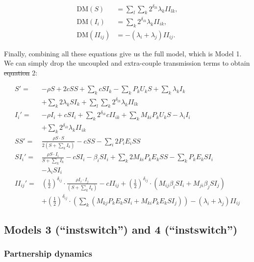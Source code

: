 \documentclass[10pt,letterpaper]{article}
\newcommand{\khalf}{\left(\frac{1}{2}\right)^{\delta_{ij}}}  %
\newcommand{\DM}{\textrm{DM}}
\providecommand{\DIFaddtex}[1]{{\protect\color{blue}\uwave{#1}}} %
\providecommand{\DIFdeltex}[1]{{\protect\color{red}\sout{#1}}}                      %
\providecommand{\DIFaddbegin}{} %
\providecommand{\DIFaddend}{} %
\providecommand{\DIFdelbegin}{} %
\providecommand{\DIFdelend}{} %
\providecommand{\DIFadd}[1]{\texorpdfstring{\DIFaddtex{#1}}{#1}} %
\providecommand{\DIFdel}[1]{\texorpdfstring{\DIFdeltex{#1}}{}} %
\newcommand{\DIFscaledelfig}{0.5}
\newlength{\DIFdelgraphicswidth} %
\newlength{\DIFdelgraphicsheight} %
\newcommand{\DIFaddincludegraphics}[2][]{{\color{blue}\fbox{\DIFOincludegraphics[#1]{#2}}}} %
\newcommand{\DIFdelincludegraphics}[2][]{%
\sbox{\DIFdelgraphicsbox}{\DIFOincludegraphics[#1]{#2}}%
\settoboxwidth{\DIFdelgraphicswidth}{\DIFdelgraphicsbox} %
\settoboxtotalheight{\DIFdelgraphicsheight}{\DIFdelgraphicsbox} %
\scalebox{\DIFscaledelfig}{%
\parbox[b]{\DIFdelgraphicswidth}{\usebox{\DIFdelgraphicsbox}\\[-\baselineskip] \rule{\DIFdelgraphicswidth}{0em}}\llap{\resizebox{\DIFdelgraphicswidth}{\DIFdelgraphicsheight}{%
\setlength{\unitlength}{\DIFdelgraphicswidth}%
\begin{picture}(1,1)%
\thicklines\linethickness{2pt} %
{\color[rgb]{1,0,0}\put(0,0){\framebox(1,1){}}}%
{\color[rgb]{1,0,0}\put(0,0){\line( 1,1){1}}}%
{\color[rgb]{1,0,0}\put(0,1){\line(1,-1){1}}}%
\end{picture}%
}\hspace*{3pt}}} %
} %
\DeclareRobustCommand{\DIFaddbegin}{\DIFOaddbegin \let\includegraphics\DIFaddincludegraphics} %
\DeclareRobustCommand{\DIFaddend}{\DIFOaddend \let\includegraphics\DIFOincludegraphics} %
\DeclareRobustCommand{\DIFdelbegin}{\DIFOdelbegin \let\includegraphics\DIFdelincludegraphics} %
\DeclareRobustCommand{\DIFdelend}{\DIFOaddend \let\includegraphics\DIFOincludegraphics} %
\begin{document}
\begin{equation}
\begin{aligned}
\DM(S) &= \sum_l \sum_k  2^{\delta_{lk}} \lambda_k II_{lk}, \\
\DM(I_i) &=  \sum_k 2^{\delta_{ik}} \lambda_k II_{ik}, \\
\DM(II_{ij}) &= -(\lambda_i + \lambda_j) II_{ij}.
\end{aligned}
\end{equation}

Finally, combining all these equations give us the full model, which is Model 1. We can simply drop the uncoupled and extra-couple transmission terms to obtain \DIFdelbegin \DIFdel{equation }\DIFdelend \DIFaddbegin \DIFadd{model }\DIFaddend 2:

\begin{equation}
\begin{aligned}
S' =& - \rho S + 2 c SS + \sum_k c SI_k - \sum_k P_k U_k S + \sum_k \lambda_k I_k \\
&+ \sum_k 2 \lambda_k SI_k + \sum_l \sum_k  2^{\delta_{lk}} \lambda_k II_{lk}\\
I_i' =&  - \rho I_i + c SI_i + \sum_k 2^{\delta_{ik}} c  II_{ik} + \sum_k M_{ki} P_k U_k S- \lambda_i I_i \\
&+ \sum_k 2^{\delta_{ik}} \lambda_k II_{ik} \\
SS' =& \frac{\rho S \cdot S}{2 (S + \sum_k I_k)} - c SS - \sum_i 2 P_i E_i SS \\
SI_i' =& \frac{\rho S \cdot I_i}{S + \sum_k I_k} - c SI_i - \beta_i SI_i + \sum_k 2 M_{ki} P_k E_k SS - \sum_k P_k E_k SI_i   \\
&- \lambda_i SI_i\\
II_{ij}' =& \khalf \cdot \frac{\rho I_i \cdot I_j}{(S + \sum_k I_k)} - c II_{ij} + \khalf \cdot (M_{ij} \beta_i SI_i + M_{ji} \beta_j SI_j) \\
&+ \khalf \cdot (\sum_k (M_{kj} P_k E_k SI_i + M_{ki} P_k E_k SI_j)) -(\lambda_i + \lambda_j) II_{ij}
\end{aligned}
\end{equation}

\subsection*{Models 3 (``instswitch'') and 4 (``instswitch'')}
\subsubsection*{Partnership dynamics}
\end{document}

